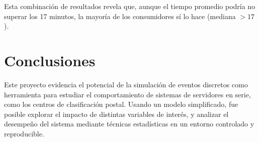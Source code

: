 \documentclass{article}
\begin{document}
Esta combinación de resultados revela que, aunque el tiempo promedio podría no superar los 17 minutos, la mayoría de los consumidores sí lo hace (mediana $> 17$).

\section{Conclusiones}

Este proyecto evidencia el potencial de la simulación de eventos discretos como herramienta para estudiar el comportamiento de sistemas de servidores en serie, como los centros de clasificación postal. Usando un modelo simplificado, fue posible explorar el impacto de distintas variables de interés, y analizar el desempeño del sistema mediante técnicas estadísticas en un entorno controlado y reproducible.
\end{document}
